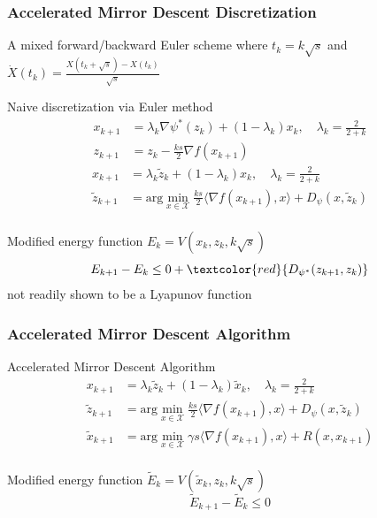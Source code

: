 \documentclass{beamer}
\begin{document}
\begin{frame}
\frametitle{Accelerated Mirror Descent Discretization  \cite{krichene2015accelerated}}
A mixed forward/backward Euler scheme where $t_k = k\sqrt{s}$ and $\dot X(t_k) = \frac{X(t_k + \sqrt{s}) - X(t_k)}{\sqrt{s}}$
\begin{block}{Naive discretization via Euler method}
 {\begin{align*} x_{k+1}  &= \lambda_k \nabla \psi^*(z_k) + (1-\lambda_k) x_{k},\quad \lambda_k =\frac{2}{2+k}\\
z_{k+1}& = z_k -\frac{ks}{2} \nabla f(x_{k+1}) 
\end{align*}}
 {\begin{align*} x_{k+1}  &= \lambda_k \tilde z_k + (1-\lambda_k) x_{k},\quad \lambda_k =\frac{2}{2+k}\\
\tilde z_{k+1} &= \text{arg}\min_{x\in\mathcal{X}} \frac{ks}{2} \langle \nabla f(x_{k+1}), x \rangle + D_\psi (x, \tilde z_k)\\
\end{align*}}
\end{block}
Modified energy function $E_k = V(x_k,z_k,k\sqrt{s})$
\[E_{k+1} - E_k \leq 0 +\textcolor{red}{ D_{\psi^*}(z_{k+1},z_k)}\]
not readily shown to be a Lyapunov function
\end{frame}

\begin{frame}
\frametitle{Accelerated Mirror Descent Algorithm  \cite{krichene2015accelerated}}
\begin{block}{Accelerated Mirror Descent Algorithm \cite{krichene2015accelerated}}
\begin{align*} 
x_{k+1}  &= \lambda_k \tilde z_k + (1-\lambda_k) \tilde x_{k},\quad \lambda_k =\frac{2}{2+k}\\
\tilde z_{k+1} &= \text{arg}\min_{x\in\mathcal{X}} \frac{ks}{2} \langle \nabla f(x_{k+1}), x \rangle + D_\psi (x, \tilde z_k)\\
\tilde x_{k+1}&=\text{arg}\min_{x\in\mathcal{X}}\gamma s \langle \nabla f(x_{k+1}), x \rangle + R (x, x_{k+1})\\
\end{align*}
\end{block}
Modified energy function $\tilde E_k = V(\tilde x_k,z_k,k\sqrt{s})$
\[\tilde E_{k+1} - \tilde E_k \leq 0\]
\end{frame}
\end{document}
